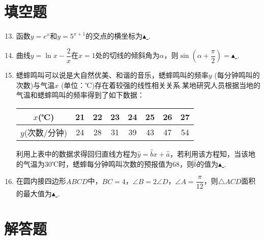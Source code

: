 \documentclass[11pt]{article}
\begin{document}
\section{\heiti 填空题}
\begin{enumerate}
	\setcounter{enumi}{12}
	\item 函数$ y=e^x $和$ y=5^{x+1} $的交点的横坐标为\underline{\quad $ \blacktriangle $ \quad}.
	\item 曲线$ y=\ln x-\dfrac{2}{x} $在$ x=1 $处的切线的倾斜角为$ \alpha $，则$ \sin \left ( \alpha +\dfrac{\pi}{2}  \right ) = $\underline{\quad $ \blacktriangle $ \quad}.
	\item 蟋蟀鸣叫可以说是大自然优美、和谐的音乐，蟋蟀鸣叫的频率$ y $ (每分钟鸣叫的次数)与气温$ x $ (单位：℃)存在着较强的线性相关关系.某地研究人员根据当地的气温和蟋蟀鸣叫的频率得到了如下数据：
	\begin{center}
		\begin{tabular}{|c|c|c|c|c|c|c|c|}
			\hline
			$x$(℃)     & 21 & 22 & 23 & 24 & 25 & 26 & 27 \\ \hline
			$y$(次数/分钟) & 24 & 28 & 31 & 39 & 43 & 47 & 54 \\ \hline
		\end{tabular}
	\end{center}
	利用上表中的数据求得回归直线方程为$ \hat{y} =\hat{b} x+\hat{a}  $，若利用该方程知，当该地的气温为30℃时，蟋蟀每分钟鸣叫次数的预报值为68，则$ \hat{b} $的值为\underline{\quad $ \blacktriangle $ \quad}.
	\item 在圆内接四边形$ ABCD $中，$ BC=4 $，$ \angle B=2\angle D $，$ \angle A=\dfrac{\pi}{12} $，则$ \triangle ACD $面积的最大值为\underline{\quad $ \blacktriangle $ \quad}.
\end{enumerate}
\section{\heiti 解答题}
\end{document}
